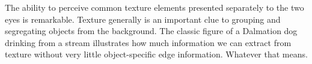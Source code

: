 \begin{figure}
\centerline{
}
\caption[Dalmation Dog]{}
\label{f10:dalmation}
\end{figure}
The ability to perceive common texture elements presented
separately to the two eyes is remarkable.
Texture generally is an important clue to grouping
and segregating objects from the background.
The classic figure of a Dalmation dog drinking from a stream
illustrates how much information we can extract from texture
without very little object-specific edge information.
Whatever that means.

